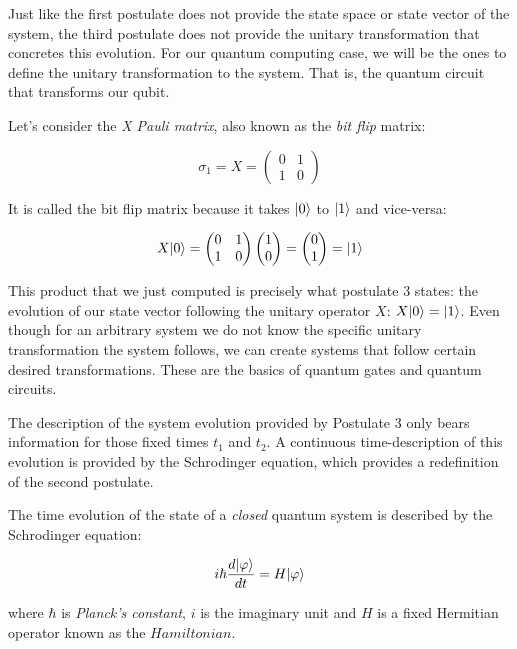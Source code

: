 Just like the first postulate does not provide the state space or state vector of the system, the third postulate does not provide the unitary transformation that concretes this evolution. For our quantum computing case, we will be the ones to define the unitary transformation to the system. That is, the quantum circuit that transforms our qubit.

\begin{exampleth} Let's consider the \emph{X Pauli matrix}, also known as the \emph{bit flip} matrix:
	
	$$ \sigma_1 = X = 
	\begin{pmatrix}
		0 & 1 \\
		1 & 0 
	\end{pmatrix}
	$$
	
	It is called the bit flip matrix because it takes $|0\rangle$ to $|1\rangle$ and vice-versa:
	
	$$  X|0\rangle = 
	\begin{pmatrix}
		0 & 1 \\
		1 & 0 
	\end{pmatrix}
	\begin{pmatrix}
		1 \\
		0 
	\end{pmatrix}=
	\begin{pmatrix}
		0 \\
		1 
	\end{pmatrix} =
	|1\rangle
	$$
	
	This product that we just computed is precisely what postulate 3 states: the evolution of our state vector following the unitary operator $X$: $X|0\rangle = |1\rangle$. Even though for an arbitrary system we do not know the specific unitary transformation the system follows, we can create systems that follow certain desired transformations. These are the basics of quantum gates and quantum circuits. 
\end{exampleth}

The description of the system evolution provided by Postulate 3 only bears information for those fixed times $t_1$ and $t_2$. A continuous time-description of this evolution is provided by the Schrodinger equation, which provides a redefinition of the second postulate.

\begin{postulate 3'}
\label{postulate-3'}
	The time evolution of the state of a \emph{closed} quantum system is described by the Schrodinger equation:
	
	$$ i \hbar \frac{d|\varphi\rangle}{dt} = H|\varphi\rangle $$
	
	where $\hbar$ is \emph{Planck’s constant}, $i$ is the imaginary unit and $H$ is a fixed Hermitian operator known as the $Hamiltonian$.
\end{postulate 3'}

